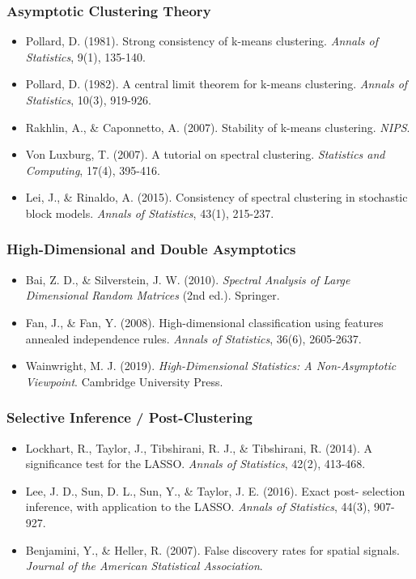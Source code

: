 \documentclass[
  12pt,
]{ctexart}
\providecommand{\tightlist}{%
  \setlength{\itemsep}{0pt}\setlength{\parskip}{0pt}}
\begin{document}
\subsubsection{Asymptotic Clustering
Theory}\label{asymptotic-clustering-theory}

\begin{itemize}
\tightlist
\item
  Pollard, D. (1981). Strong consistency of k-means clustering.
  \emph{Annals of Statistics}, 9(1), 135-140.
\item
  Pollard, D. (1982). A central limit theorem for k-means clustering.
  \emph{Annals of Statistics}, 10(3), 919-926.
\item
  Rakhlin, A., \& Caponnetto, A. (2007). Stability of k-means
  clustering. \emph{NIPS}.
\item
  Von Luxburg, T. (2007). A tutorial on spectral clustering.
  \emph{Statistics and Computing}, 17(4), 395-416.
\item
  Lei, J., \& Rinaldo, A. (2015). Consistency of spectral clustering in
  stochastic block models. \emph{Annals of Statistics}, 43(1), 215-237.
\end{itemize}

\subsubsection{High-Dimensional and Double
Asymptotics}\label{high-dimensional-and-double-asymptotics}

\begin{itemize}
\tightlist
\item
  Bai, Z. D., \& Silverstein, J. W. (2010). \emph{Spectral Analysis of
  Large Dimensional Random Matrices} (2nd ed.). Springer.
\item
  Fan, J., \& Fan, Y. (2008). High-dimensional classification using
  features annealed independence rules. \emph{Annals of Statistics},
  36(6), 2605-2637.
\item
  Wainwright, M. J. (2019). \emph{High-Dimensional Statistics: A
  Non-Asymptotic Viewpoint}. Cambridge University Press.
\end{itemize}

\subsubsection{Selective Inference /
Post-Clustering}\label{selective-inference-post-clustering}

\begin{itemize}
\tightlist
\item
  Lockhart, R., Taylor, J., Tibshirani, R. J., \& Tibshirani, R. (2014).
  A significance test for the LASSO. \emph{Annals of Statistics}, 42(2),
  413-468.
\item
  Lee, J. D., Sun, D. L., Sun, Y., \& Taylor, J. E. (2016). Exact post-
  selection inference, with application to the LASSO. \emph{Annals of
  Statistics}, 44(3), 907-927.
\item
  Benjamini, Y., \& Heller, R. (2007). False discovery rates for spatial
  signals. \emph{Journal of the American Statistical Association}.
\end{itemize}
\end{document}
